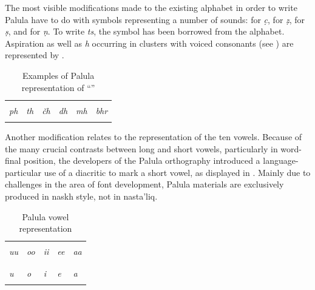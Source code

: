 

The most visible modifications made to the existing \iliUrdu alphabet in order to write Palula have to do with symbols representing a number of  sounds: {\large{}}  for \textit{c̣}, {\large{}} for \textit{ẓ}, {\large{}} for \textit{ṣ}, and {\large{}} for \textit{ṇ}. To write \textit{ts}, the symbol {\large{}} has been borrowed from the \iliPashto alphabet. Aspiration as well as \textit{h} occurring in clusters with voiced consonants (see ) are represented by {\large{}}.


\begin{table}
\caption{Examples of Palula representation of ``''}
\begin{tabularx}{\textwidth}{ Q Q Q Q Q Q }
\lsptoprule
\LARGE{}
&\LARGE{}
&\LARGE{}
&\LARGE{}
&\LARGE{}
&\LARGE{}\\
\textit{ph} &
\textit{th} &
\textit{čh} &
\textit{dh} &
\textit{mh} &
\textit{bhr}\\\lspbottomrule
\end{tabularx}
\label{tab:1-4bb}
\end{table}


Another modification relates to the representation of the ten vowels. Because of the many crucial contrasts between long and short vowels, particularly in word-final position, the developers of the Palula orthography introduced a language-particular use of a diacritic {\large{}} to mark a short vowel, as displayed in . Mainly due to challenges in the area of font development, Palula materials are exclusively produced in naskh style, not in nasta’liq.


\begin{table}
\caption{Palula vowel representation}
\begin{tabularx}{\textwidth}{ Q Q Q Q Q }
\lsptoprule
\LARGE{}
&\LARGE{}
&\LARGE{}
&\LARGE{}
&\LARGE{}\\
\textit{uu} &
\textit{oo} &
\textit{ii} &
\textit{ee} &
\textit{aa}\\
\\
\LARGE{}
&\LARGE{}
&\LARGE{}
&\LARGE{}
&\LARGE{}\\
\textit{u} &
\textit{o} &
\textit{i} &
\textit{e} &
\textit{a}\\\lspbottomrule
\end{tabularx}
\label{tab:1-4c}
\end{table}


